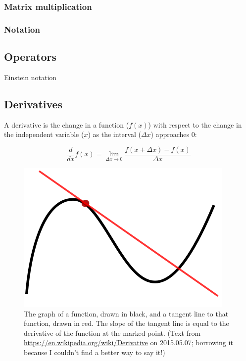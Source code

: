 \documentclass[a4paper,10pt]{scrartcl}
\begin{document}
\subsubsection{Matrix multiplication}




\subsubsection{Notation}



\subsection{Operators}




Einstein notation

\subsubsection{}



\subsection{Derivatives}

A derivative is the change in a function ($f(x)$) with respect to the change in the independent variable ($x$) as the interval ($\Delta x$) approaches 0:

\begin{equation}
 \frac{d}{{dx}}f\left( x \right) = \mathop {\lim }\limits_{\Delta x \to 0} \frac{{f\left( {x + \Delta x } \right) - f\left( x \right)}}{\Delta x }
\end{equation}

\begin{figure}[!ht]
\begin{center}
\includegraphics[width=.5\linewidth]{figures/NumericalAndMath/400px-Tangent_to_a_curve.png}
\end{center}
\caption{The graph of a function, drawn in black, and a tangent line to that function, drawn in red. The slope of the tangent line is equal to the derivative of the function at the marked point. (Text from \url{https://en.wikipedia.org/wiki/Derivative} on 2015.05.07; borrowing it because I couldn't find a better way to say it!)}
\end{figure}
\end{document}
